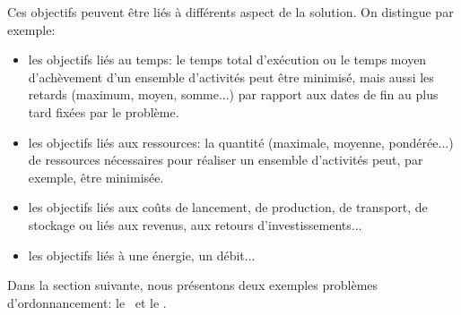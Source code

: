 Ces objectifs peuvent être liés à différents aspect de la solution. On
distingue par exemple:
\begin{itemize}
\item les objectifs liés au temps: le temps total d'exécution ou le temps moyen
  d'achèvement d'un ensemble d'activités peut être minimisé, mais
  aussi  les retards (maximum, moyen, somme...) par rapport
  aux dates de fin au plus tard fixées par le problème.
\item les objectifs liés aux ressources: la quantité (maximale,
  moyenne, pondérée...) de ressources nécessaires pour réaliser un
  ensemble d'activités peut, par exemple, être minimisée.
\item les objectifs liés aux coûts de lancement, de production, de
  transport, de stockage ou liés aux revenus, aux retours
  d'investissements... 
\item les objectifs liés à une énergie, un débit...
\end{itemize}

Dans la section suivante, nous présentons deux exemples problèmes
d'ordonnancement: le \RCPSP~et le \CUSP.